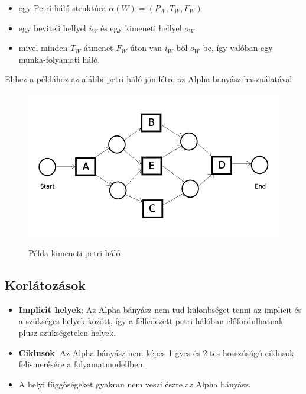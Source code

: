 \begin{itemize}
\item egy Petri háló struktúra $\alpha (W) = (P_W, T_W, F_W)$
\item egy beviteli hellyel $i_W$ és egy kimeneti hellyel $o_W$
\item mivel minden $T_W$ átmenet $F_W$-úton van $i_W$-ből $o_W$-be, így valóban egy munka\hyp{}folyamati háló.
\end{itemize}

\noindent Ehhez a példához az alábbi petri háló jön létre az Alpha bányász használatával
\begin{figure}[h]
\caption{Példa kimeneti petri háló}
\begin{center}
\includegraphics[width=\textwidth,height=\textheight,keepaspectratio]{images/img_alpha_petri_output}\\
\label{fig:example}
\end{center}
\end{figure}

\newpage

\subsection{Korlátozások}
\begin{itemize}
\item \textbf{Implicit helyek}: Az Alpha bányász nem tud különbséget tenni az implicit és a szükséges helyek között, így a felfedezett petri hálóban előfordulhatnak plusz szükségetelen helyek.
\item \textbf{Ciklusok}: Az Alpha bányász nem képes 1-gyes és 2-tes hosszúságú ciklusok felismerésére a folyamatmodellben.
\item A helyi függőségeket gyakran nem veszi észre az Alpha bányász.
\end{itemize}

